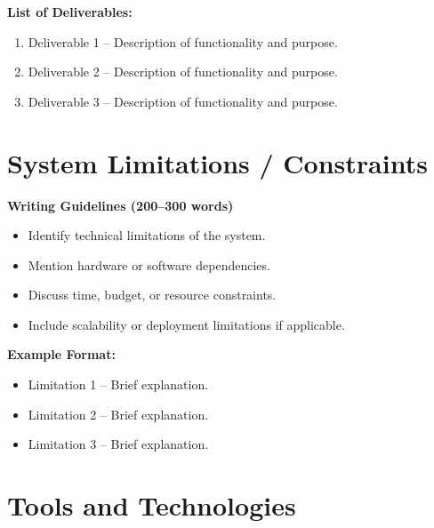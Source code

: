 \vspace{0.5cm}

\textbf{List of Deliverables:}

\begin{enumerate}
    \item Deliverable 1 – Description of functionality and purpose.
    \item Deliverable 2 – Description of functionality and purpose.
    \item Deliverable 3 – Description of functionality and purpose.
\end{enumerate}




\section{System Limitations / Constraints}

\textbf{Writing Guidelines (200–300 words)}

\begin{itemize}
    \item Identify technical limitations of the system.
    \item Mention hardware or software dependencies.
    \item Discuss time, budget, or resource constraints.
    \item Include scalability or deployment limitations if applicable.
\end{itemize}

\vspace{0.5cm}

\textbf{Example Format:}

\begin{itemize}
    \item Limitation 1 – Brief explanation.
    \item Limitation 2 – Brief explanation.
    \item Limitation 3 – Brief explanation.
\end{itemize}




\section{Tools and Technologies}


